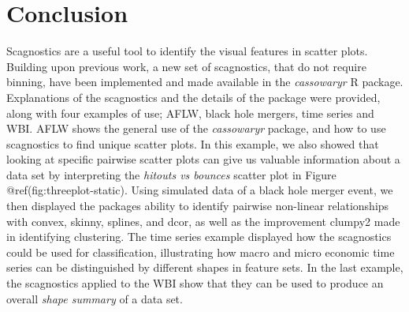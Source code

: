 \hypertarget{conclusion}{%
\section{Conclusion}\label{conclusion}}

Scagnostics are a useful tool to identify the visual features in scatter
plots. Building upon previous work, a new set of scagnostics, that do
not require binning, have been implemented and made available in the
\emph{cassowaryr} R package. Explanations of the scagnostics and the
details of the package were provided, along with four examples of use;
AFLW, black hole mergers, time series and WBI. AFLW shows the general
use of the \emph{cassowaryr} package, and how to use scagnostics to find
unique scatter plots. In this example, we also showed that looking at
specific pairwise scatter plots can give us valuable information about a
data set by interpreting the \emph{hitouts vs bounces} scatter plot in
Figure @ref(fig:threeplot-static). Using simulated data of a black hole
merger event, we then displayed the packages ability to identify
pairwise non-linear relationships with convex, skinny, splines, and
dcor, as well as the improvement clumpy2 made in identifying clustering.
The time series example displayed how the scagnostics could be used for
classification, illustrating how macro and micro economic time series
can be distinguished by different shapes in feature sets. In the last
example, the scagnostics applied to the WBI show that they can be used
to produce an overall \emph{shape summary} of a data set.

